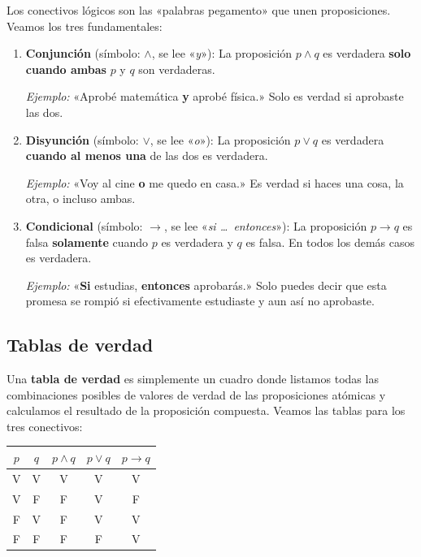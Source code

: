 \documentclass[12pt, letterpaper]{article}
\begin{document}
Los conectivos lógicos son las «palabras pegamento» que unen proposiciones. Veamos los tres fundamentales:

\begin{cuadrosolucion}
  \begin{enumerate}[label=\arabic*., leftmargin=*]
    \item \textbf{Conjunción} (símbolo: $\wedge$, se lee «\emph{y}»): La proposición $p \wedge q$ es verdadera \textbf{solo cuando ambas} $p$ y $q$ son verdaderas.

          \textit{Ejemplo:} «Aprobé matemática \textbf{y} aprobé física.» Solo es verdad si aprobaste las dos.

    \item \textbf{Disyunción} (símbolo: $\vee$, se lee «\emph{o}»): La proposición $p \vee q$ es verdadera \textbf{cuando al menos una} de las dos es verdadera.

          \textit{Ejemplo:} «Voy al cine \textbf{o} me quedo en casa.» Es verdad si haces una cosa, la otra, o incluso ambas.

    \item \textbf{Condicional} (símbolo: $\rightarrow$, se lee «\emph{si \ldots\ entonces}»): La proposición $p \rightarrow q$ es falsa \textbf{solamente} cuando $p$ es verdadera y $q$ es falsa. En todos los demás casos es verdadera.

          \textit{Ejemplo:} «\textbf{Si} estudias, \textbf{entonces} aprobarás.» Solo puedes decir que esta promesa se rompió si efectivamente estudiaste y aun así no aprobaste.
  \end{enumerate}
\end{cuadrosolucion}

\subsection{Tablas de verdad}

Una \textbf{tabla de verdad} es simplemente un cuadro donde listamos todas las combinaciones posibles de valores de verdad de las proposiciones atómicas y calculamos el resultado de la proposición compuesta. Veamos las tablas para los tres conectivos:

\begin{center}
  \begin{tabular}{cc|c|c|c}
    \toprule
    $p$ & $q$ & $p \wedge q$ & $p \vee q$ & $p \rightarrow q$ \\
    \midrule
    V   & V   & V            & V          & V                 \\
    V   & F   & F            & V          & F                 \\
    F   & V   & F            & V          & V                 \\
    F   & F   & F            & F          & V                 \\
    \bottomrule
  \end{tabular}
\end{center}
\end{document}
